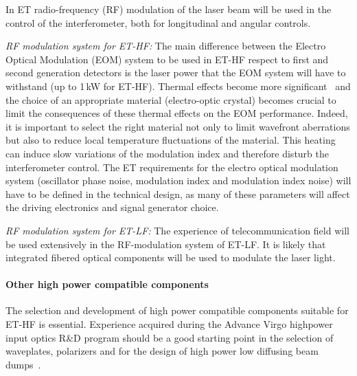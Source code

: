 In ET radio-frequency (RF) modulation of the laser beam will be used in the control of the interferometer, both for longitudinal and angular controls.

\emph{RF modulation system for ET-HF:}
The main difference between the Electro Optical Modulation (EOM) system to be used in ET-HF respect to first and
second generation detectors is the laser power that the EOM system will have to withstand (up to 1\,kW for ET-HF).
Thermal effects become more significant~\cite{Mansell} and the choice of an appropriate material (electro-optic  crystal)
 becomes crucial to limit the consequences of these thermal effects on the EOM performance. Indeed, it is
 important to select the right material not only to limit wavefront aberrations but also to reduce local temperature fluctuations
 of the material. This heating can induce slow variations of the modulation index and therefore disturb the interferometer control.
The ET requirements  for the electro optical modulation system (oscillator phase noise, modulation index and modulation
index noise) will have to be defined in the technical design, as many of these parameters will affect the driving electronics and signal generator choice.

\emph{RF modulation system for ET-LF:}
The experience of telecommunication field will be used extensively in the RF-modulation system of ET-LF. It is likely that integrated fibered optical components will be used to modulate the laser light.

\paragraph{Other high power compatible components}
\nopagebreak

The selection and development of high power compatible components suitable for ET-HF is essential. Experience acquired during the Advance Virgo highpower input optics R\&D program should be a good starting point in the selection of waveplates, polarizers and for the design of high power low diffusing beam dumps~\cite{HPIOfinal,genin}.

%
%


